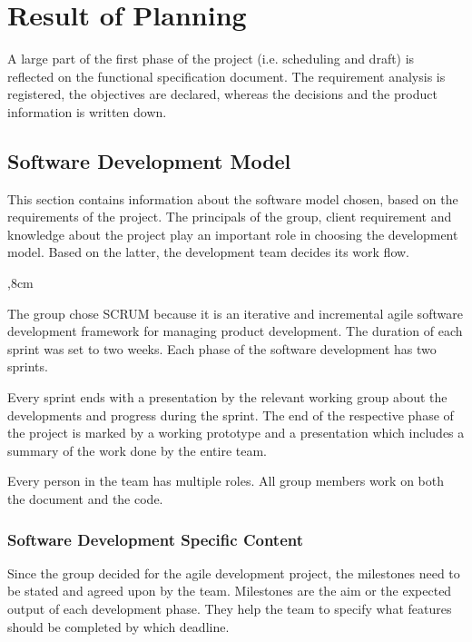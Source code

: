 \section{Result of Planning}
A large part of the first phase of the project (i.e. scheduling and draft) is reflected on the functional specification document. The requirement analysis is registered, the objectives are declared, whereas the decisions and the product information is written down.

\subsection{Software Development Model}

This section contains information about the software model chosen, based on the requirements of the project.
The principals of the group, client requirement and knowledge about the project play an important role in choosing the development model. Based on the latter, the development team decides its work flow. 

\begin{description}
	,8cm
	\item[Agile Development Model: SCRUM] The group chose SCRUM because it is an iterative and incremental agile software development framework for managing product development. The duration of each sprint was set to two weeks. Each phase of the software development has two sprints. 
	
	Every sprint ends with a presentation by the relevant working group about the developments and progress during the sprint. The end of the respective phase of the project is marked by a working prototype and a presentation which includes a summary of the work done by the entire team. 
	
	\item[Projects specific adaptation to the model:] Every person in the team has multiple roles. All group members work on both the document and the code.
\end{description} 

\subsubsection{Software Development Specific Content}
Since the group decided for the agile development project, the milestones need to be stated and agreed upon by the team. Milestones are the aim or the expected output of each development phase. They help the team to specify what features should be completed by which deadline.

